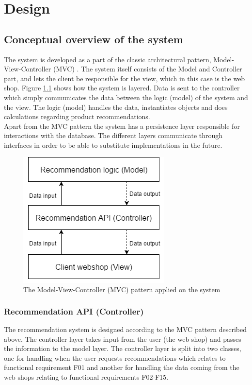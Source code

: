 
\chapter{Design} %

\label{Chapter3} %


\section{Conceptual overview of the system}
The system is developed as a part of the classic architectural pattern, Model-View-Controller (MVC) \cite{PatternsOfEnterprise}. The system itself consists of the Model and Controller part, and lets the client be responsible for the view, which in this case is the web shop. Figure \ref{fig:MVC} shows how the system is layered. Data is sent to the controller which simply communicates the data between the logic (model) of the system and the view. The logic (model) handles the data, instantiates objects and does calculations regarding product recommendations. \\
Apart from the MVC pattern the system has a persistence layer responsible for interactions with the database. The different layers communicate through interfaces in order to be able to substitute implementations in the future. 

\begin{figure}[H]
	\centering
	\includegraphics[width=.4\linewidth]{Figures/MVC.png}
	\caption{The Model-View-Controller (MVC) pattern applied on the system}
	\label{fig:MVC}
\end{figure}

\subsection{Recommendation API (Controller)}
The recommendation system is designed according to the MVC pattern described above. The controller layer takes input from the user (the web shop) and passes the information to the model layer. The controller layer is split into two classes, one for handling when the user requests recommendations which relates to functional requirement F01 and another for handling the data coming from the web shops relating to functional requirements F02-F15.


